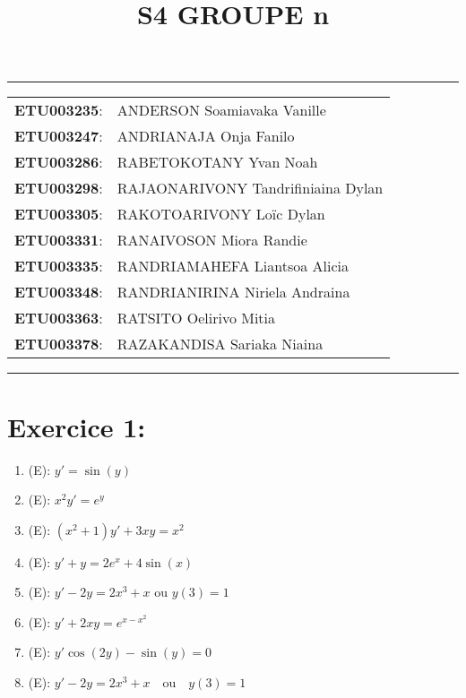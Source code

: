 \documentclass[a4paper,12pt]{article}
\begin{document}
	
\title{\textbf{S4 GROUPE n}}
\date{}
\maketitle

\hrule
\vspace{1em}

\begin{tabular}{rl}
	\textbf{ETU003235}: & ANDERSON Soamiavaka Vanille \\
	\textbf{ETU003247}: & ANDRIANAJA Onja Fanilo \\
	\textbf{ETU003286}: & RABETOKOTANY Yvan Noah \\
	\textbf{ETU003298}: & RAJAONARIVONY Tandrifiniaina Dylan \\
	\textbf{ETU003305}: & RAKOTOARIVONY Loïc Dylan \\
	\textbf{ETU003331}: & RANAIVOSON Miora Randie \\
	\textbf{ETU003335}: & RANDRIAMAHEFA Liantsoa Alicia \\
	\textbf{ETU003348}: & RANDRIANIRINA Niriela Andraina \\
	\textbf{ETU003363}: & RATSITO Oelirivo Mitia \\
	\textbf{ETU003378}: & RAZAKANDISA Sariaka Niaina \\
\end{tabular}

\vspace{1em}
\hrule

\newpage
\section*{Exercice 1:}
\begin{enumerate}
	\item (E): $y' = \sin(y)$ \\
	

	\item (E): $x^2 y' = e^y$ \\
	

	\item (E): $(x^2 + 1) y' + 3xy = x^2$ \\
	
		
	\item (E): $y' + y = 2e^x + 4 \sin(x)$ \\
	
	
	\item (E): $y' - 2y = 2x^3 + x \text{ ou } y(3)=1$

	\item (E): $y' + 2xy = e^{x-x^2}$

	\item (E): $y' \cos(2y) - \sin(y) = 0$

	\item (E): $y' - 2y = 2x^3 + x \quad \text{ou} \quad y(3)=1$
\end{enumerate}
\end{document}
